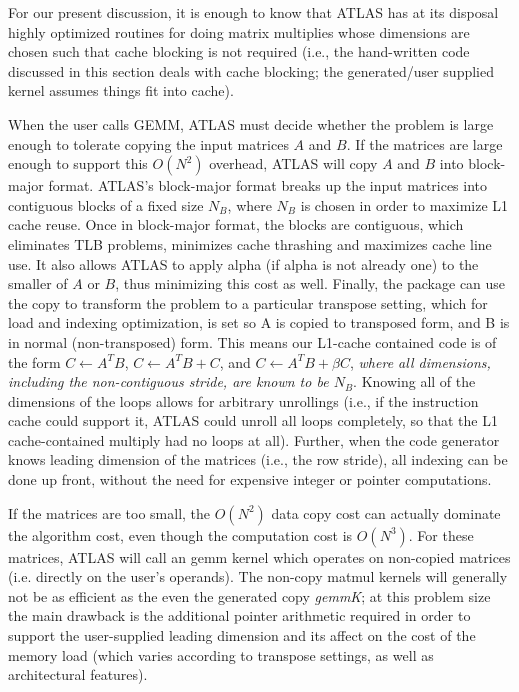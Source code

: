 \documentclass[11pt]{article}
\begin{document}
For our present discussion, it is enough to know
that ATLAS has at its disposal highly optimized routines for doing matrix
multiplies whose dimensions are chosen such that cache blocking is not
required (i.e., the hand-written code discussed in this section deals
with cache blocking; the generated/user supplied kernel assumes things fit
into cache).

When the user calls GEMM, ATLAS must decide whether the problem
is large enough to tolerate copying the input matrices $A$ and $B$.
If the matrices are large enough to support this $O(N^2)$ overhead, ATLAS will
copy $A$ and $B$
into block-major format.  ATLAS's block-major format breaks up the input
matrices into contiguous blocks of a fixed size $N_B$, where $N_B$ is chosen
in order to maximize L1 cache
reuse.  Once in block-major format, the blocks are contiguous, which
eliminates TLB problems, minimizes cache thrashing and maximizes cache line
use.  It also allows ATLAS to apply alpha (if alpha is not already one) to the
smaller of $A$ or $B$, thus minimizing this cost as well.  Finally, the
package can use the copy to transform the problem to a particular transpose
setting, which for load and indexing optimization, is set so
A is copied to transposed form, and B is in normal (non-transposed) form.
This means our L1-cache contained code is of the form
$C \leftarrow A^T B$, $C \leftarrow A^T B + C$,
and $C \leftarrow A^T B + \beta C$,
{\em where all dimensions, including the non-contiguous stride, are known
to be $N_B$}.  Knowing all of the dimensions of the loops allows for
arbitrary unrollings (i.e., if the instruction cache could support it, ATLAS
could unroll all loops completely, so that the L1 cache-contained multiply
had no loops at all).  Further, when the code generator knows leading dimension
of the matrices (i.e., the row stride), all indexing can be done up front,
without the need for expensive integer or pointer computations.

If the matrices are too small, the $O(N^2)$ data copy cost can actually
dominate the algorithm cost, even though the computation cost is $O(N^3)$.
For these matrices, ATLAS will call an gemm kernel which operates on non-copied
matrices (i.e. directly on the user's operands).  The non-copy matmul kernels
will generally not be as efficient as the even the generated copy {\it gemmK};
at this problem
size the main drawback is the additional pointer arithmetic required in order
to support the user-supplied leading dimension and its affect on the cost of
the memory load (which varies according to transpose settings, as well as
architectural features).
\end{document}
